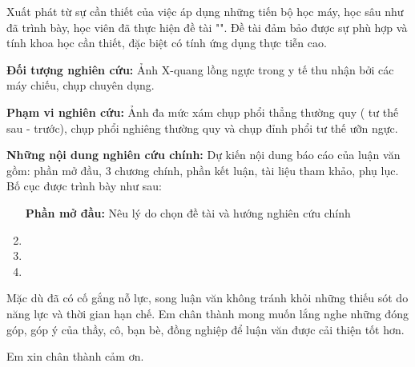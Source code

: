 Xuất phát từ sự cần thiết của việc áp dụng những tiến bộ học máy, học sâu như đã trình bày, học viên đã thực hiện đề tài "\tenluanvan". Đề tài đảm bảo được sự phù hợp và tính khoa học cần thiết, đặc biệt có tính ứng dụng thực tiễn cao. 

\textbf{Đối tượng nghiên cứu:} Ảnh X-quang lồng ngực trong y tế thu nhận bởi các máy chiếu, chụp chuyên dụng.

\textbf{Phạm vi nghiên cứu:} Ảnh đa mức xám chụp phổi thẳng thường quy ( tư thế sau - trước), chụp phổi nghiêng thường quy và chụp đỉnh phổi tư thế ưỡn ngực.

\textbf{Những nội dung nghiên cứu chính:} Dự kiến nội dung báo cáo của luận văn gồm: phần mở đầu, 3 chương chính, phần kết luận, tài liệu tham khảo, phụ lục. Bố cục được trình bày như sau:

\begin{enumerate}[wide, label=\bfseries Chương \arabic*:]
	\item [\bfseries Phần mở đầu:] Nêu lý do chọn đề tài và hướng nghiên cứu chính
	\item \tenchuongi 
	\item \tenchuongii
	\item \tenchuongiii
\end{enumerate}

Mặc dù đã có cố gắng nỗ lực, song luận văn không tránh khỏi những thiếu sót do năng lực và thời gian hạn chế. Em chân thành mong muốn lắng nghe những đóng góp, góp ý của thầy, cô, bạn bè, đồng nghiệp để luận văn được cải thiện tốt hơn.

Em xin chân thành cảm ơn.
